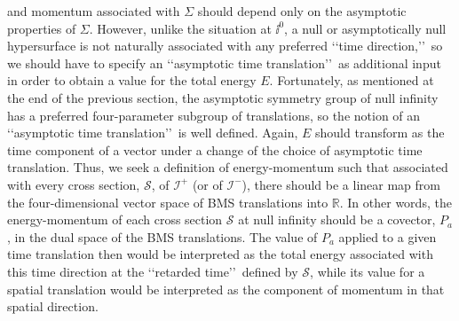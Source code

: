 and momentum associated with \(\Sigma\) should depend only on the asymptotic
properties of \(\Sigma\). However, unlike the situation at \(\ii^0\), a null or
asymptotically null hypersurface is not naturally associated with any preferred
\lq\lq time direction,\rq\rq\ so we should have to specify an \lq\lq asymptotic time
translation\rq\rq\ as additional input in order to obtain a value for the total energy
\(E\). Fortunately, as mentioned at the end of the previous section, the asymptotic
symmetry group of null infinity has a preferred four-parameter subgroup of
translations, so the notion of an \lq\lq asymptotic time translation\rq\rq\ is well
defined. Again, \(E\) should transform as the time component of a vector under a
change of the choice of asymptotic time translation. Thus, we seek a definition of
energy-momentum such that associated with every cross section, \(\mathcal S\), of
\(\mathcal I^+\) (or of \(\mathcal I^-\)), there should be a linear map from the
four-dimensional vector space of BMS translations into \(\mathbb R\). In other
words, the energy-momentum of each cross section \(\mathcal S\) at null infinity
should be a covector, \(P_a\), in the dual space of the BMS translations. The value
of \(P_a\) applied to a given time translation then would be interpreted as the total
energy associated with this time direction at the \lq\lq retarded time\rq\rq\ defined by
\(\mathcal S\), while its value for a spatial translation would be interpreted as the
component of momentum in that spatial direction.

